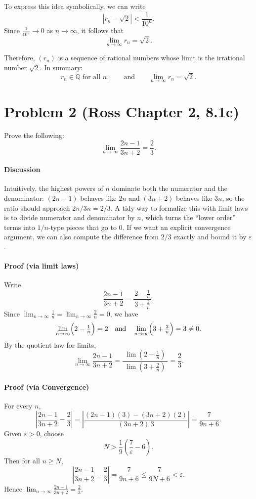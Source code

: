 \documentclass[12pt]{article}
\begin{document}
\smallskip
To express this idea symbolically, we can write
\[
|r_n - \sqrt{2}| < \frac{1}{10^n}.
\]
Since $\frac{1}{10^n} \to 0$ as $n \to \infty$, it follows that
\[
\lim_{n \to \infty} r_n = \sqrt{2}.
\]

\smallskip
Therefore, $(r_n)$ is a sequence of rational numbers whose limit is the irrational number $\sqrt{2}$.  
In summary:
\[
r_n \in \mathbb{Q} \text{ for all } n, 
\qquad \text{and} \qquad
\lim_{n \to \infty} r_n = \sqrt{2}.
\]

\section*{Problem 2 (Ross Chapter 2, 8.1c)}
Prove the following:
\[
\lim_{n \to \infty} \frac{2n - 1}{3n + 2} = \frac{2}{3}.
\]

\paragraph{Discussion}
Intuitively, the highest powers of \(n\) dominate both the numerator and the denominator:
\((2n-1)\) behaves like \(2n\) and \((3n+2)\) behaves like \(3n\), so the ratio should
approach \(2n/3n = 2/3\). A tidy way to formalize this with limit laws is to divide
numerator and denominator by \(n\), which turns the “lower order” terms into \(1/n\)-type
pieces that go to \(0\). If we want an explicit convergence argument, we can
also compute the difference from \(2/3\) exactly and bound it by \(\varepsilon\).

\paragraph{Proof (via limit laws)}
Write
\[
\frac{2n-1}{3n+2}
= \frac{\,\displaystyle 2-\frac1n\,}{\,\displaystyle 3+\frac2n\,}.
\]
Since \(\lim_{n\to\infty}\tfrac1n=\lim_{n\to\infty}\tfrac2n=0\), we have
\[
\lim_{n\to\infty}\Bigl(2-\tfrac1n\Bigr)=2
\quad\text{and}\quad
\lim_{n\to\infty}\Bigl(3+\tfrac2n\Bigr)=3\neq 0.
\]
By the quotient law for limits,
\[
\lim_{n\to\infty}\frac{2n-1}{3n+2}
=\frac{\;\lim(2-\tfrac1n)\;}{\;\lim(3+\tfrac2n)\;}
=\frac{2}{3}.
\]

\paragraph{Proof (via Convergence)}
For every \(n\),
\[
\left|\frac{2n-1}{3n+2}-\frac23\right|
= \left|\frac{(2n-1)(3)-(3n+2)(2)}{(3n+2)\,3}\right|
= \frac{7}{9n+6}.
\]
Given \(\varepsilon>0\), choose
\[
N>\frac{1}{9}\left(\frac{7}{\varepsilon}-6\right).
\]
Then for all \(n\ge N\),
\[
\left|\frac{2n-1}{3n+2}-\frac23\right|=\frac{7}{9n+6}
\le \frac{7}{9N+6}<\varepsilon.
\]
Hence $\lim_{n\to\infty}\frac{2n-1}{3n+2}=\frac{2}{3}$.
\end{document}
